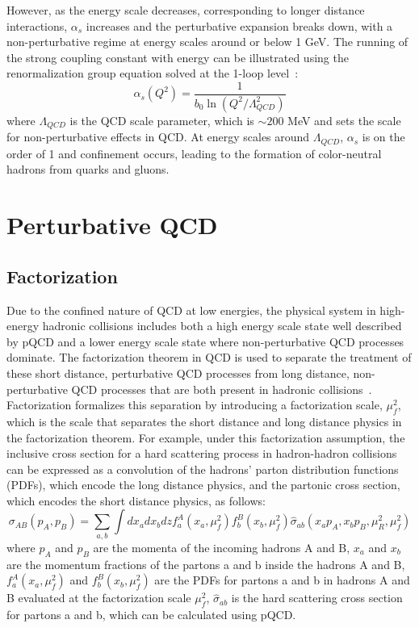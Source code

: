 However, as the energy scale decreases, corresponding to longer distance interactions, $\alpha_s$ increases and the perturbative expansion breaks down, with a non-perturbative regime at energy scales around or below 1 GeV. 
The running of the strong coupling constant with energy can be illustrated using the renormalization group equation solved at the 1-loop level~\cite{Peskin:1995ev,particles_and_nuclei,Ellis:1996qcd_collider_physics}:
\begin{equation}
    \alpha_s(Q^2) = \frac{1}{b_0 \ln(Q^2 / \Lambda_{QCD}^2)}
\end{equation}
where $\Lambda_{QCD}$ is the QCD scale parameter, which is $\sim200$ MeV and sets the scale for non-perturbative effects in QCD.
At energy scales around $\Lambda_{QCD}$, $\alpha_s$ is on the order of 1 and confinement occurs, leading to the formation of color-neutral hadrons from quarks and gluons. 

\section{Perturbative QCD}
\label{sec:pQCD}

\subsection{Factorization}
Due to the confined nature of QCD at low energies, the physical system in high-energy hadronic collisions includes both a high energy scale state well described by pQCD and a lower energy scale state where non-perturbative QCD processes dominate.
The factorization theorem in QCD is used to separate the treatment of these short distance, perturbative QCD processes from long distance, non-perturbative QCD processes that are both present in hadronic collisions~\cite{factorization_review}.
Factorization formalizes this separation by introducing a factorization scale, $\mu_f^2$, which is the scale that separates the short distance and long distance physics in the factorization theorem.
For example, under this factorization assumption, the inclusive cross section for a hard scattering process in hadron-hadron collisions can be expressed as a convolution of the hadrons' parton distribution functions (PDFs), which encode the long distance physics, and the partonic cross section, which encodes the short distance physics, as follows:
\begin{equation}
    \sigma_{AB}(p_{A}, p_{B}) = \sum_{a,b} \int dx_a dx_b dz f^{A}_{a}(x_a, \mu_f^2) f^{B}_{b}(x_b, \mu_f^2) \hat{\sigma}_{ab}(x_{a}p_{A}, x_{b}p_{B},\mu_R^2,\mu_f^2)
\end{equation}
where $p_{A}$ and $p_{B}$ are the momenta of the incoming hadrons A and B, $x_a$ and $x_b$ are the momentum fractions of the partons a and b inside the hadrons A and B, $f^{A}_{a}(x_a, \mu_f^2)$ and $f^{B}_{b}(x_b, \mu_f^2)$ are the PDFs for partons a and b in hadrons A and B evaluated at the factorization scale $\mu_f^2$, $\hat{\sigma}_{ab}$ is the hard scattering cross section for partons a and b, which can be calculated using pQCD.

